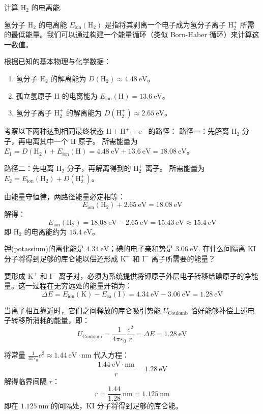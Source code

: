 \begin{exercise}\label{ex:26.1}
计算 $\mathrm{H}_2$ 的电离能.
\end{exercise}
\begin{solution}
氢分子 $\mathrm{H}_2$ 的电离能 $E_{\mathrm{ion}}(\mathrm{H}_2)$ 是指将其剥离一个电子成为氢分子离子 $\mathrm{H}_2^+$ 所需的最低能量。我们可以通过构建一个能量循环（类似 Born-Haber 循环）来计算这一数值。

根据已知的基本物理与化学数据：
\begin{enumerate}
    \item 氢分子 $\mathrm{H}_2$ 的解离能为 $D(\mathrm{H}_2) \approx 4.48 \ \mathrm{eV}$。
    \item 孤立氢原子 $\mathrm{H}$ 的电离能为 $E_{\mathrm{ion}}(\mathrm{H}) = 13.6 \ \mathrm{eV}$。
    \item 氢分子离子 $\mathrm{H}_2^+$ 的解离能为 $D(\mathrm{H}_2^+) \approx 2.65 \ \mathrm{eV}$。
\end{enumerate}

考察以下两种达到相同最终状态 $\mathrm{H} + \mathrm{H}^+ + \mathrm{e}^-$ 的路径：
路径一：先解离 $\mathrm{H}_2$ 分子，再电离其中一个 $\mathrm{H}$ 原子。
所需能量为 $E_1 = D(\mathrm{H}_2) + E_{\mathrm{ion}}(\mathrm{H}) = 4.48 \ \mathrm{eV} + 13.6 \ \mathrm{eV} = 18.08 \ \mathrm{eV}$。

路径二：先电离 $\mathrm{H}_2$ 分子，再解离得到的 $\mathrm{H}_2^+$ 离子。
所需能量为 $E_2 = E_{\mathrm{ion}}(\mathrm{H}_2) + D(\mathrm{H}_2^+)$。

由能量守恒律，两路径能量必定相等：
$$ E_{\mathrm{ion}}(\mathrm{H}_2) + 2.65 \ \mathrm{eV} = 18.08 \ \mathrm{eV} $$
解得：
$$ E_{\mathrm{ion}}(\mathrm{H}_2) = 18.08 \ \mathrm{eV} - 2.65 \ \mathrm{eV} = 15.43 \ \mathrm{eV} \approx 15.4 \ \mathrm{eV} $$
即 $\mathrm{H}_2$ 的电离能约为 $15.4 \ \mathrm{eV}$。
\end{solution}

\begin{exercise}\label{ex:26.2}
钾(potassium)的离化能是 $4.34 \ \mathrm{eV}$；碘的电子亲和势是 $3.06 \ \mathrm{eV}$. 在什么间隔离 $\mathrm{KI}$ 分子将得到足够的库仑能以偿还形成 $\mathrm{K}^+$ 和 $\mathrm{I}^-$ 离子所需要的能量？
\end{exercise}
\begin{solution}
要形成 $\mathrm{K}^+$ 和 $\mathrm{I}^-$ 离子对，必须为系统提供将钾原子外层电子转移给碘原子的净能量。这一过程在无穷远处的能量开销为：
$$ \Delta E = E_{\mathrm{ion}}(\mathrm{K}) - E_{\mathrm{ea}}(\mathrm{I}) = 4.34 \ \mathrm{eV} - 3.06 \ \mathrm{eV} = 1.28 \ \mathrm{eV} $$

当离子相互靠近时，它们之间释放的库仑吸引势能 $U_{\mathrm{Coulomb}}$ 恰好能够补偿上述电子转移所消耗的能量，即：
$$ U_{\mathrm{Coulomb}} = \frac{1}{4\pi\varepsilon_0} \frac{e^2}{r} = \Delta E = 1.28 \ \mathrm{eV} $$

将常量 $\frac{1}{4\pi\varepsilon_0} e^2 \approx 1.44 \ \mathrm{eV \cdot nm}$ 代入方程：
$$ \frac{1.44 \ \mathrm{eV \cdot nm}}{r} = 1.28 \ \mathrm{eV} $$
解得临界间隔 $r$：
$$ r = \frac{1.44}{1.28} \ \mathrm{nm} = 1.125 \ \mathrm{nm} $$
即在 $1.125 \ \mathrm{nm}$ 的间隔处，$\mathrm{KI}$ 分子将得到足够的库仑能。
\end{solution}

